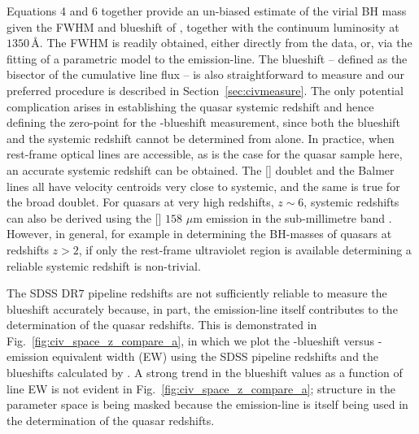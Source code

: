Equations 4 and 6 together provide an un-biased estimate of the virial BH mass given the FWHM and blueshift of , together with the continuum luminosity at $1350$\,\AA. 
The FWHM is readily obtained, either directly from the data, or, via the fitting of a parametric model to the  emission-line. 
The blueshift -- defined as the bisector of the cumulative line flux -- is also straightforward to measure and our preferred procedure is described in Section~\ref{sec:civmeasure}.
The only potential complication arises in establishing the quasar systemic redshift and hence defining the zero-point for the -blueshift measurement, since both the blueshift and the systemic redshift cannot be determined from  alone. 
In practice, when rest-frame optical lines are accessible, as is the case for the quasar sample here, an accurate systemic redshift can be obtained. 
The [] doublet and the Balmer lines all have velocity centroids very close to systemic, and the same is true for the broad  doublet. 
For quasars at very high redshifts, $z\sim6$, systemic redshifts can also be derived using the [] $158$ $\mu$m emission in the sub-millimetre band \citep[e.g.][]{venemans16}. 
However, in general, for example in determining the BH-masses of quasars at redshifts $z>2$, if only the rest-frame ultraviolet region is available determining a reliable systemic redshift is non-trivial. 

The SDSS DR$7$ pipeline redshifts are not sufficiently reliable to measure the  blueshift accurately because, in part, the  emission-line itself contributes to the determination of the quasar redshifts. 
This is demonstrated in Fig.~\ref{fig:civ_space_z_compare_a}, in which we plot the -blueshift versus -emission equivalent width (EW) using the SDSS pipeline redshifts and the blueshifts calculated by \citet{shen11}.  
A strong trend in the blueshift values as a function of line EW is not evident in Fig.~\ref{fig:civ_space_z_compare_a}; structure in the parameter space is being masked because the  emission-line is itself being used in the determination of the quasar redshifts. 

